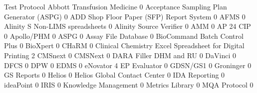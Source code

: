 \documentclass{article}
\begin{document}
\begin{Schunk}
\begin{Soutput}
                                                            Test Protocol
  Abbott Transfusion Medicine                                           0
  Acceptance Sampling Plan Generator (ASPG)                             0
  ADD Shop Floor Paper (SFP) Report System                              0
  AFMS                                                                  0
  Alinity S Non-LIMS spreadsheets                                       0
  Alinity Source Verifier                                               0
  AMM                                                                   0
  AP 24 CIP                                                             0
  Apollo/PHM                                                            0
  ASPG                                                                  0
  Assay File Database                                                   0
  BioCommand Batch Control Plus                                         0
  BioXpert                                                              0
  CHaRM                                                                 0
  Clinical Chemistry Excel Spreadsheet for Digital Printing             2
  CMSnext                                                               0
  CMSNext                                                               0
  DARA Filler DHM and RU                                                0
  DaVinci                                                               0
  DFCS                                                                  0
  DPW                                                                   0
  EDMS                                                                  0
  eNovator                                                              4
  EP Evaluator                                                          0
  GDSN/GS1                                                              0
  Groninger                                                             0
  GS Reports                                                            0
  Helios                                                                0
  Helios Global Contact Center                                          0
  IDA Reporting                                                         0
  ideaPoint                                                             0
  IRIS                                                                  0
  Knowledge Management                                                  0
  Metrics Library                                                       0
  MQA Protocol                                                          0

\end{Soutput}
\end{Schunk}
\end{document}
